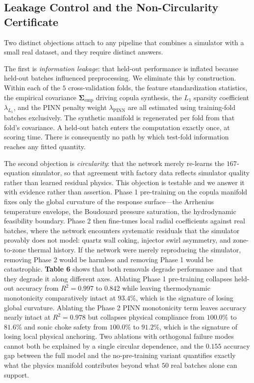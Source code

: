 \documentclass[10pt,journal,onecolumn]{IEEEtran}
\begin{document}
\subsection{Leakage Control and the Non-Circularity Certificate}
Two distinct objections attach to any pipeline that combines a simulator with a small real dataset, and they require distinct answers.

The first is \textit{information leakage}: that held-out performance is inflated because held-out batches influenced preprocessing. We eliminate this by construction. Within each of the $5$ cross-validation folds, the feature standardization statistics, the empirical covariance $\boldsymbol{\Sigma}_{\text{emp}}$ driving copula synthesis, the $L_1$ sparsity coefficient $\lambda_{L_1}$, and the PINN penalty weight $\lambda_{\text{PINN}}$ are all estimated using training-fold batches exclusively. The synthetic manifold is regenerated per fold from that fold's covariance. A held-out batch enters the computation exactly once, at scoring time. There is consequently no path by which test-fold information reaches any fitted quantity.

The second objection is \textit{circularity}: that the network merely re-learns the $167$-equation simulator, so that agreement with factory data reflects simulator quality rather than learned residual physics. This objection is testable and we answer it with evidence rather than assertion. Phase 1 pre-training on the copula manifold fixes only the global curvature of the response surface—the Arrhenius temperature envelope, the Boudouard pressure saturation, the hydrodynamic feasibility boundary. Phase 2 then fine-tunes local radial coefficients against real batches, where the network encounters systematic residuals that the simulator provably does not model: quartz wall coking, injector swirl asymmetry, and zone-to-zone thermal history. If the network were merely reproducing the simulator, removing Phase 2 would be harmless and removing Phase 1 would be catastrophic. \textbf{Table 6} shows that both removals degrade performance and that they degrade it along different axes. Ablating Phase 1 pre-training collapses held-out accuracy from $R^2 = 0.997$ to $0.842$ while leaving thermodynamic monotonicity comparatively intact at $93.4\%$, which is the signature of losing global curvature. Ablating the Phase 2 PINN monotonicity term leaves accuracy nearly intact at $R^2 = 0.978$ but collapses physical compliance from $100.0\%$ to $81.6\%$ and sonic choke safety from $100.0\%$ to $91.2\%$, which is the signature of losing local physical anchoring. Two ablations with orthogonal failure modes cannot both be explained by a single circular dependence, and the $0.155$ accuracy gap between the full model and the no-pre-training variant quantifies exactly what the physics manifold contributes beyond what $50$ real batches alone can support.
\end{document}

